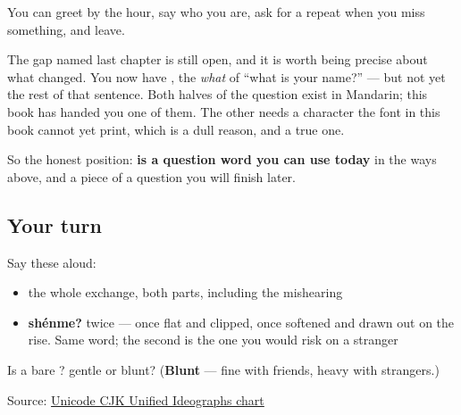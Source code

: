 \begin{grammarlens}[title={What you've built — and the question you still cannot ask}]
You can greet by the hour, say who you are, ask for a repeat when you miss something, and leave.

The gap named last chapter is still open, and it is worth being precise about what changed. You now have \textbf{}, the \emph{what} of \textquotedblleft{}what is your name?\textquotedblright{} — but not yet the rest of that sentence. Both halves of the question exist in Mandarin; this book has handed you one of them. The other needs a character the font in this book cannot yet print, which is a dull reason, and a true one.

So the honest position: \textbf{ is a question word you can use today} in the ways above, and a piece of a question you will finish later.
\end{grammarlens}

\subsection*{Your turn}
Say these aloud:

\begin{itemize}
\raggedright
  \item the whole exchange, both parts, including the mishearing
  \item \textbf{shénme?} twice — once flat and clipped, once softened and drawn out on the rise. Same word; the second is the one you would risk on a stranger
\end{itemize}

\begin{tcolorbox}[breakable,colback=teal!4,colframe=teal!35!black,title={Before you move on}]
Is a bare ? gentle or blunt? (\textbf{Blunt} — fine with friends, heavy with strangers.)

Source: \href{https://www.unicode.org/charts/PDF/U4E00.pdf}{Unicode CJK Unified Ideographs chart}
\end{tcolorbox}
